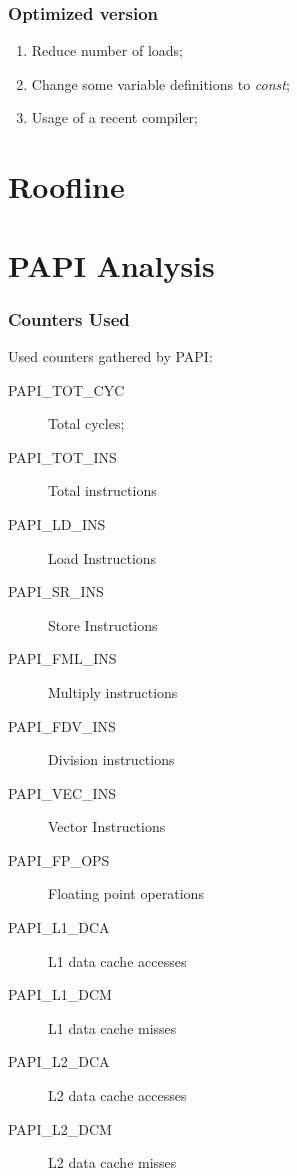 \documentclass{beamer}
\begin{document}
\begin{frame}
	\frametitle{Optimized version}
	\begin{enumerate}
		\item Reduce number of loads;
		\item Change some variable definitions to \emph{const};
		\item Usage of a recent compiler;
	\end{enumerate} 
\end{frame}


\section{Roofline}
\begin{frame}
	\begin{figure}[!htp]
		\label{fig:roofline}
	\end{figure}
\end{frame}

\section{PAPI Analysis}
\begin{frame}
	\frametitle{Counters Used}

	Used counters gathered by PAPI:
	\begin{description}
		\item[PAPI\_TOT\_CYC] Total cycles;
		\item[PAPI\_TOT\_INS] Total instructions
		\item[PAPI\_LD\_INS] Load Instructions
		\item[PAPI\_SR\_INS] Store Instructions
		\item[PAPI\_FML\_INS] Multiply instructions
		\item[PAPI\_FDV\_INS] Division instructions
		\item[PAPI\_VEC\_INS] Vector Instructions
		\item[PAPI\_FP\_OPS] Floating point operations
		\item[PAPI\_L1\_DCA] L1 data cache accesses
		\item[PAPI\_L1\_DCM] L1 data cache misses
		\item[PAPI\_L2\_DCA] L2 data cache accesses
		\item[PAPI\_L2\_DCM] L2 data cache misses
	\end{description}
\end{frame}
\end{document}
